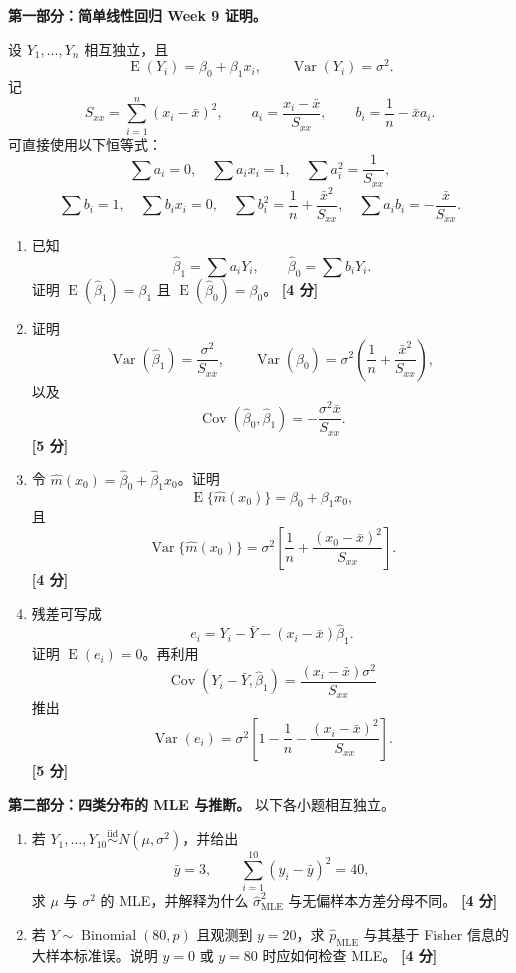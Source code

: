 \documentclass[11pt,a4paper]{article}
\newcommand{\E}{\operatorname{E}}
\newcommand{\Var}{\operatorname{Var}}
\newcommand{\Cov}{\operatorname{Cov}}
\newcommand{\iid}{\overset{\mathrm{iid}}{\sim}}
\newcommand{\pts}[1]{\hfill\textbf{[#1 分]}}
\begin{document}
\begin{questionbox}
\textbf{第一部分：简单线性回归 Week 9 证明。}

设 $Y_1,\ldots,Y_n$ 相互独立，且
\[
  \E(Y_i)=\beta_0+\beta_1x_i,
  \qquad
  \Var(Y_i)=\sigma^2.
\]
记
\[
  S_{xx}=\sum_{i=1}^n(x_i-\bar x)^2,
  \qquad
  a_i=\frac{x_i-\bar x}{S_{xx}},
  \qquad
  b_i=\frac1n-\bar x a_i.
\]
可直接使用以下恒等式：
\[
  \sum a_i=0,\quad
  \sum a_ix_i=1,\quad
  \sum a_i^2=\frac1{S_{xx}},
\]
\[
  \sum b_i=1,\quad
  \sum b_ix_i=0,\quad
  \sum b_i^2=\frac1n+\frac{\bar x^2}{S_{xx}},
  \quad
  \sum a_ib_i=-\frac{\bar x}{S_{xx}}.
\]

\begin{enumerate}
  \item 已知
  \[
    \hat\beta_1=\sum a_iY_i,
    \qquad
    \hat\beta_0=\sum b_iY_i.
  \]
  证明 $\E(\hat\beta_1)=\beta_1$ 且 $\E(\hat\beta_0)=\beta_0$。 \pts{4}
  \item 证明
  \[
    \Var(\hat\beta_1)=\frac{\sigma^2}{S_{xx}},
    \qquad
    \Var(\hat\beta_0)=\sigma^2\left(\frac1n+\frac{\bar x^2}{S_{xx}}\right),
  \]
  以及
  \[
    \Cov(\hat\beta_0,\hat\beta_1)
    =
    -\frac{\sigma^2\bar x}{S_{xx}}.
  \]
  \pts{5}
  \item 令 $\hat m(x_0)=\hat\beta_0+\hat\beta_1x_0$。证明
  \[
    \E\{\hat m(x_0)\}=\beta_0+\beta_1x_0,
  \]
  且
  \[
    \Var\{\hat m(x_0)\}
    =
    \sigma^2\left[
      \frac1n+\frac{(x_0-\bar x)^2}{S_{xx}}
    \right].
  \]
  \pts{4}
  \item 残差可写成
  \[
    e_i=Y_i-\bar Y-(x_i-\bar x)\hat\beta_1.
  \]
  证明 $\E(e_i)=0$。再利用
  \[
    \Cov(Y_i-\bar Y,\hat\beta_1)
    =
    \frac{(x_i-\bar x)\sigma^2}{S_{xx}}
  \]
  推出
  \[
    \Var(e_i)
    =
    \sigma^2\left[
      1-\frac1n-\frac{(x_i-\bar x)^2}{S_{xx}}
    \right].
  \]
  \pts{5}
\end{enumerate}

\textbf{第二部分：四类分布的 MLE 与推断。}
以下各小题相互独立。

\begin{enumerate}[resume]
  \item 若 $Y_1,\ldots,Y_{10}\iid N(\mu,\sigma^2)$，并给出
  \[
    \bar y=3,
    \qquad
    \sum_{i=1}^{10}(y_i-\bar y)^2=40,
  \]
  求 $\mu$ 与 $\sigma^2$ 的 MLE，并解释为什么 $\hat\sigma^2_{\mathrm{MLE}}$ 与无偏样本方差分母不同。 \pts{4}

  \item 若 $Y\sim\operatorname{Binomial}(80,p)$ 且观测到 $y=20$，求 $\hat p_{\mathrm{MLE}}$ 与其基于 Fisher 信息的大样本标准误。说明 $y=0$ 或 $y=80$ 时应如何检查 MLE。 \pts{4}


\end{enumerate}
\end{questionbox}
\end{document}
